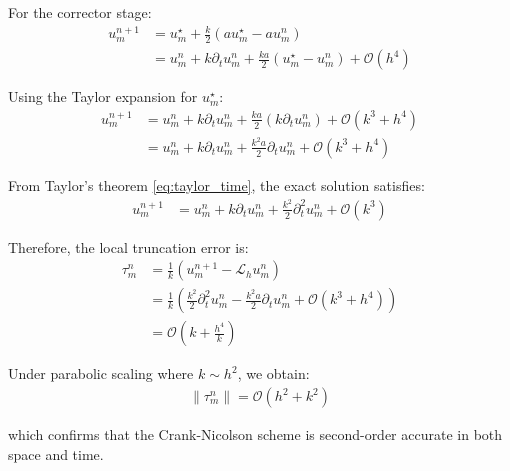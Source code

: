 For the corrector stage:
\begin{align}
  u_m^{n+1} & = u_m^\star + \frac{k}{2}(au_m^\star - au_m^n)                                    \\
            & = u_m^n + k \partial_t u_m^n + \frac{ka}{2}(u_m^\star - u_m^n) + \mathcal{O}(h^4)
\end{align}

Using the Taylor expansion for $u_m^\star$:
\begin{align}
  u_m^{n+1} & = u_m^n + k \partial_t u_m^n + \frac{ka}{2}(k \partial_t u_m^n) + \mathcal{O}(k^3 + h^4) \\
            & = u_m^n + k \partial_t u_m^n + \frac{k^2a}{2} \partial_t u_m^n + \mathcal{O}(k^3 + h^4)
\end{align}

From Taylor's theorem \eqref{eq:taylor_time}, the exact solution satisfies:
\begin{align}
  u_m^{n+1} & = u_m^n + k \partial_t u_m^n + \frac{k^2}{2}\partial_t^2 u_m^n + \mathcal{O}(k^3)
\end{align}

Therefore, the local truncation error is:
\begin{align}
  \tau_m^n & = \frac{1}{k}\left(u_m^{n+1} - \mathcal{L}_h u_m^n\right)                                                           \\
           & = \frac{1}{k}\left(\frac{k^2}{2}\partial_t^2 u_m^n - \frac{k^2a}{2}\partial_t u_m^n + \mathcal{O}(k^3 + h^4)\right) \\
           & = \mathcal{O}\left(k + \frac{h^4}{k}\right)
\end{align}

Under parabolic scaling where $k \sim h^2$, we obtain:
\begin{align}
  \|\tau_m^n\| = \mathcal{O}(h^2 + k^2)
\end{align}

which confirms that the Crank-Nicolson scheme is second-order accurate in both space and time.